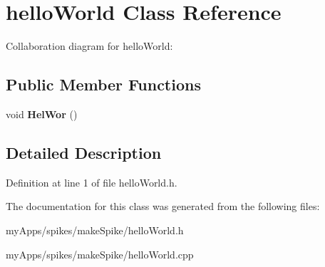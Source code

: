\hypertarget{classhelloWorld}{}\section{hello\+World Class Reference}
\label{classhelloWorld}


Collaboration diagram for hello\+World\+:
\subsection*{Public Member Functions}
\begin{DoxyCompactItemize}
\item 
\mbox{\label{classhelloWorld_a2c4cab52b4a1d625f861c14eb04e3f27}} 
void {\bfseries Hel\+Wor} ()
\end{DoxyCompactItemize}


\subsection{Detailed Description}


Definition at line 1 of file hello\+World.\+h.



The documentation for this class was generated from the following files\+:\begin{DoxyCompactItemize}
\item 
my\+Apps/spikes/make\+Spike/hello\+World.\+h\item 
my\+Apps/spikes/make\+Spike/hello\+World.\+cpp\end{DoxyCompactItemize}
